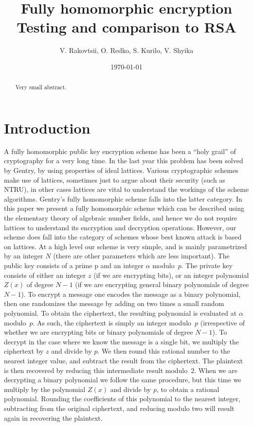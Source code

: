 \documentclass[a4paper, 12pt]{article}
\title{Fully homomorphic encryption\\
	 \vspace{2mm}
	 {\large Testing and comparison to RSA}}
\author{V. Rakovtsii, O. Redko, S. Kurilo, V. Shyika}
\date{\today}
\begin{document}
	
	\clearpage
	\maketitle
	\thispagestyle{empty}
	
	
	\clearpage
	\thispagestyle{empty}
	\begin{abstract}
		Very small abstract.
	\end{abstract}
	
	
	\tableofcontents
	
	
	\section{Introduction}
	
	A fully homomorphic public key encryption scheme has been a “holy grail” of cryptography for a very long time.
	In the last year this problem has been solved by Gentry, by using properties of ideal lattices. 
	Various cryptographic schemes make use of lattices, sometimes just to argue about their security (such as NTRU), in other cases lattices are vital to understand the workings of the scheme algorithms. 
	Gentry’s fully homomorphic scheme falls into the latter category.
	In this paper we present a fully homomorphic scheme which can be described using the elementary theory of algebraic number fields, and hence we do not require lattices to understand its encryption and decryption operations. However, our scheme does fall into the category of schemes whose best known attack is based on lattices.
	At a high level our scheme is very simple, and is mainly parametrized by an integer $N$ (there are other parameters which are less important).
	The public key consists of a prime p and an integer $\alpha$ modulo~$p$.
	The private key consists of either an integer $z$ (if we are encrypting bits), or an integer polynomial $Z(x)$ of degree $N-1$ (if we are encrypting general binary polynomials of degree $N-1$).
	To encrypt a message one encodes the message as a binary polynomial, then one randomizes the message by adding on two times a small random polynomial.
	To obtain the ciphertext, the resulting polynomial is evaluated at $\alpha$ modulo~$p$.
	As such, the ciphertext is simply an integer modulo~$p$ (irrespective of whether we are encrypting bits or binary polynomials of degree $N-1$).
	To decrypt in the case where we know the message is a single bit, we multiply the ciphertext by $z$ and divide by $p$. 
	We then round this rational number to the nearest integer value, and subtract the result from the ciphertext. 
	The plaintext is then recovered by reducing this intermediate result modulo~2. 
	When we are decrypting a binary polynomial we follow the same procedure, but this time we multiply by the polynomial $Z(x)$ and divide by $p$, to obtain a rational polynomial. 
	Rounding the coefficients of this polynomial to the nearest integer, subtracting from the original ciphertext, and reducing modulo two will result again in recovering the plaintext.
	
\end{document}
